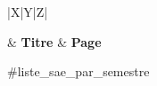 
\setlength{\tabcolsep}{0.125cm} %
\setlength{\extrarowheight}{2pt} %

\begin{center}

    \small

    \begin{tabular}[t]{|X|Y|Z|}

         & {\bfseries Titre} & {\bfseries Page} \\
        \hline

        #liste_sae_par_semestre

        \hline

    \end{tabular}

\end{center}
